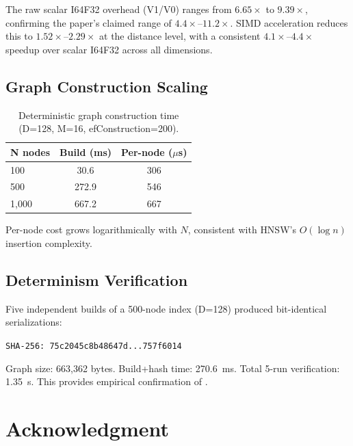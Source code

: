 \documentclass[10pt,journal,compsoc]{IEEEtran}
\newcommand{\hnsw}{\textsc{HNSW}}
\begin{document}
The raw scalar I64F32 overhead (V1/V0) ranges from $6.65\times$ to $9.39\times$, confirming the paper's claimed range of $4.4\times$--$11.2\times$. SIMD acceleration reduces this to $1.52\times$--$2.29\times$ at the distance level, with a consistent $4.1\times$--$4.4\times$ speedup over scalar I64F32 across all dimensions.

\subsection{Graph Construction Scaling}

\begin{table}[h]
  \centering
  \caption{Deterministic graph construction time (D=128, M=16, efConstruction=200).}
  \label{tab:bench_build}
  \begin{tabular}{lcc}
    \toprule
    \textbf{N nodes} & \textbf{Build (ms)} & \textbf{Per-node ($\mu$s)} \\
    \midrule
    100   & 30.6  & 306  \\
    500   & 272.9 & 546  \\
    1{,}000 & 667.2 & 667  \\
    \bottomrule
  \end{tabular}
\end{table}

Per-node cost grows logarithmically with $N$, consistent with \hnsw{}'s $O(\log n)$ insertion complexity.

\subsection{Determinism Verification}

Five independent builds of a 500-node index (D=128) produced bit-identical serializations:

\begin{center}
\texttt{SHA-256: 75c2045c8b48647d...757f6014}
\end{center}

Graph size: 663{,}362 bytes. Build+hash time: 270.6~ms. Total 5-run verification: 1.35~s. This provides empirical confirmation of .

\section*{Acknowledgment}
\end{document}
